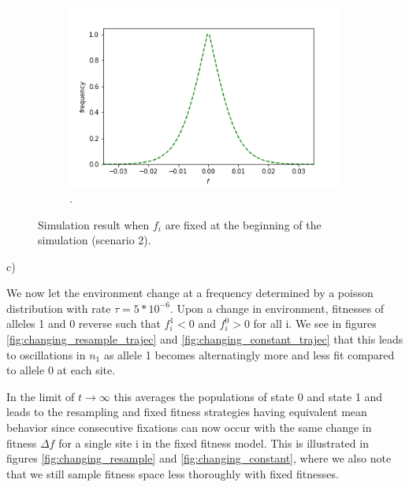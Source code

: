 \documentclass{article}
\begin{document}
\begin{figure}[h]
\begin{subfigure}[t]{0.305\linewidth}
		\centering
		\includegraphics[width = 1.0\linewidth, trim={5 5 40 30}, clip=true]{figures/sym_combined_dists.png}
		.
		\label{fig:simconst}	
	\end{subfigure}
\caption{Simulation result when $f_i$ are fixed at the beginning of the simulation (scenario 2).}
\label{fig:const}
\end{figure}

\newpage


c)

We now let the environment change at a frequency determined by a poisson distribution with rate $\tau = 5*10^{-6}$. Upon a change in environment, fitnesses of alleles 1 and 0 reverse such that $f_i^1 < 0$ and $f_i^0 > 0$ for all i. We see in figures \ref{fig:changing_resample_trajec} and \ref{fig:changing_constant_trajec} that this leads to oscillations in $n_1$ as allele 1 becomes alternatingly more and less fit compared to allele 0 at each site.

In the limit of $t \rightarrow \infty$ this averages the populations of state 0 and state 1 and leads to the resampling and fixed fitness strategies having equivalent mean behavior since consecutive fixations can now occur with the same change in fitness $\Delta f$ for a single site i in the fixed fitness model. This is illustrated in figures \ref{fig:changing_resample} and \ref{fig:changing_constant}, where we also note that we still sample fitness space less thoroughly with fixed fitnesses.
\end{document}

